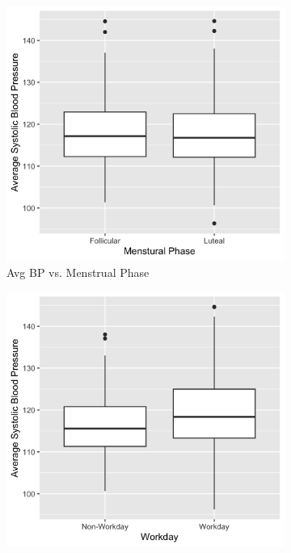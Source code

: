 \documentclass[12pt,twoside,leqno,fleqn,letterpaper]{article}
\theoremstyle{definition}
\theoremstyle{definition}
\begin{document}
\begin{figure}
\centering
\begin{subfigure}[b]{0.475\textwidth}
\centering
\includegraphics[width=\textwidth]{pics/bp v phase.png}
\caption[]%
{{\small Avg BP vs. Menstrual Phase}}
\label{fig: bp v phase}
\end{subfigure}
\hfill
\begin{subfigure}[b]{0.475\textwidth}
\centering
\includegraphics[width=\textwidth]{pics/bp v day.png}

\end{subfigure}
\end{figure}
\end{document}
